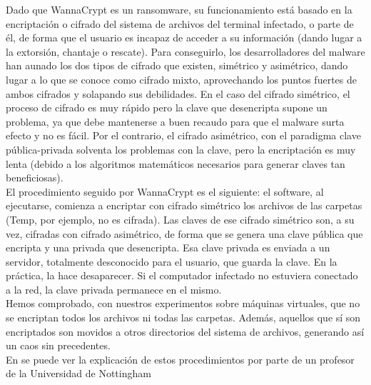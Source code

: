 Dado que WannaCrypt es un ransomware, su funcionamiento está basado en la encriptación o cifrado del sistema de archivos del terminal infectado, o parte de él, de forma que el usuario es incapaz de acceder a su información (dando lugar a la extorsión, chantaje o rescate). Para conseguirlo, los desarrolladores del malware han aunado los dos tipos de cifrado que existen, simétrico y asimétrico, dando lugar a lo que se conoce como cifrado mixto, aprovechando los puntos fuertes de ambos cifrados y solapando sus debilidades. En el caso del cifrado simétrico, el proceso de cifrado es muy rápido pero la clave que desencripta supone un problema, ya que debe mantenerse a buen recaudo para que el malware surta efecto y no es fácil. Por el contrario, el cifrado asimétrico, con el paradigma clave pública-privada solventa los problemas con la clave, pero la encriptación es muy lenta (debido a los algoritmos matemáticos necesarios para generar claves tan beneficiosas). \\

El procedimiento seguido por WannaCrypt es el siguiente: el software, al ejecutarse, comienza a encriptar con cifrado simétrico los archivos de las carpetas (Temp, por ejemplo, no es cifrada). Las claves de ese cifrado simétrico son, a su vez, cifradas con cifrado asimétrico, de forma que se genera una clave pública que encripta y una privada que desencripta. Esa clave privada es enviada a un servidor, totalmente desconocido para el usuario, que guarda la clave. En la práctica, la hace desaparecer. Si el computador infectado no estuviera conectado a la red, la clave privada permanece en el mismo. \\

Hemos comprobado, con nuestros experimentos sobre máquinas virtuales, que no se encriptan todos los archivos ni todas las carpetas. Además, aquellos que sí son encriptados son movidos a otros directorios del sistema de archivos, generando así un caos sin precedentes. \\

En \cite{wc-encrip} se puede ver la explicación de estos procedimientos por parte de un profesor de la Universidad de Nottingham